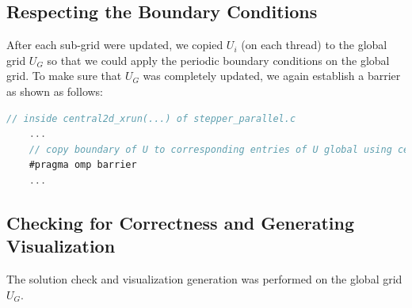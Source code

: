 \documentclass{article}
\begin{document}
\subsection{Respecting the Boundary Conditions}
After each sub-grid were updated, we copied $U_i$ (on each thread) to the global grid $U_G$ so that 
we could apply the periodic boundary conditions on the global grid. To make sure that $U_G$ was completely updated, we again establish 
a barrier as shown as follows: 

\begin{lstlisting}[language=C]
// inside central2d_xrun(...) of stepper_parallel.c
    ...
    // copy boundary of U to corresponding entries of U global using central2d_local_to_global(...)
    #pragma omp barrier
    ...
\end{lstlisting}

\subsection{Checking for Correctness and Generating Visualization}
The solution check and visualization generation was performed on the global grid $U_G$.



\end{document}
